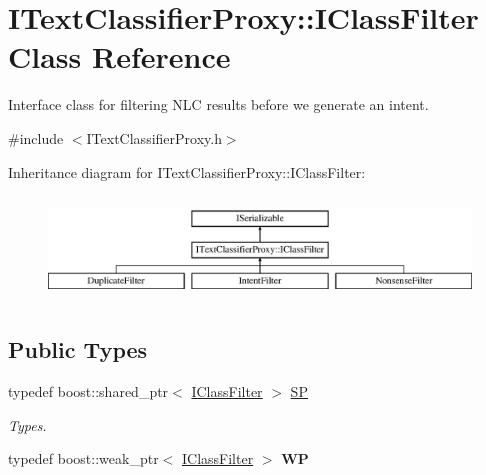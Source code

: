 \hypertarget{class_i_text_classifier_proxy_1_1_i_class_filter}{}\section{I\+Text\+Classifier\+Proxy\+:\+:I\+Class\+Filter Class Reference}
\label{class_i_text_classifier_proxy_1_1_i_class_filter}


Interface class for filtering N\+LC results before we generate an intent.  




{\ttfamily \#include $<$I\+Text\+Classifier\+Proxy.\+h$>$}

Inheritance diagram for I\+Text\+Classifier\+Proxy\+:\+:I\+Class\+Filter\+:\begin{figure}[H]
\begin{center}
\leavevmode
\includegraphics[height=2.786070cm]{class_i_text_classifier_proxy_1_1_i_class_filter}
\end{center}
\end{figure}
\subsection*{Public Types}
\begin{DoxyCompactItemize}
\item 
\mbox{\label{class_i_text_classifier_proxy_1_1_i_class_filter_a357b80113ef82baf44162575250c4d75}} 
typedef boost\+::shared\+\_\+ptr$<$ \hyperlink{class_i_text_classifier_proxy_1_1_i_class_filter}{I\+Class\+Filter} $>$ \hyperlink{class_i_text_classifier_proxy_1_1_i_class_filter_a357b80113ef82baf44162575250c4d75}{SP}
\begin{DoxyCompactList}\small\item\em Types. \end{DoxyCompactList}\item 
\mbox{\label{class_i_text_classifier_proxy_1_1_i_class_filter_aba641210a4a893e3a63c7eaab8b6b2f3}} 
typedef boost\+::weak\+\_\+ptr$<$ \hyperlink{class_i_text_classifier_proxy_1_1_i_class_filter}{I\+Class\+Filter} $>$ {\bfseries WP}
\end{DoxyCompactItemize}
